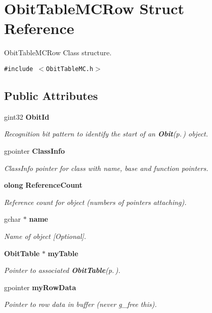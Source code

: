 \section{Obit\-Table\-MCRow Struct Reference}
\label{structObitTableMCRow}
Obit\-Table\-MCRow Class structure.  


{\tt \#include $<$Obit\-Table\-MC.h$>$}

\subsection*{Public Attributes}
\begin{CompactItemize}
\item 
gint32 {\bf Obit\-Id}
\begin{CompactList}\small\item\em Recognition bit pattern to identify the start of an {\bf Obit}{\rm (p.\,\pageref{structObit})} object. \item\end{CompactList}\item 
gpointer {\bf Class\-Info}
\begin{CompactList}\small\item\em Class\-Info pointer for class with name, base and function pointers. \item\end{CompactList}\item 
{\bf olong} {\bf Reference\-Count}
\begin{CompactList}\small\item\em Reference count for object (numbers of pointers attaching). \item\end{CompactList}\item 
gchar $\ast$ {\bf name}
\begin{CompactList}\small\item\em Name of object [Optional]. \item\end{CompactList}\item 
{\bf Obit\-Table} $\ast$ {\bf my\-Table}
\begin{CompactList}\small\item\em Pointer to associated {\bf Obit\-Table}{\rm (p.\,\pageref{structObitTable})}. \item\end{CompactList}\item 
gpointer {\bf my\-Row\-Data}
\begin{CompactList}\small\item\em Pointer to row data in buffer (never g\_\-free this). \item\end{CompactList}\item 

\end{CompactItemize}

